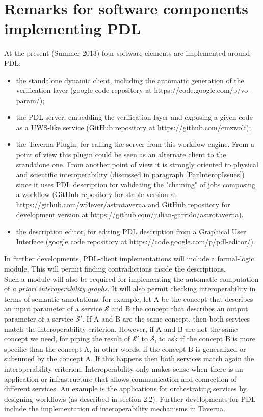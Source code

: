 \documentclass[a4paper,11pt] {ivoa}
\begin{document}
\section{Remarks for software components implementing PDL}
At the present (Summer 2013) four software elements are implemented around PDL:
\begin{itemize}
\item the standalone dynamic client, including the automatic generation of the verification layer (google code repository at https://code.google.com/p/vo-param/);
\item the PDL server, embedding the verification layer and exposing a given code as a UWS-like service (GitHub repository at https://github.com/cmzwolf);
\item the Taverna Plugin, for calling the server from this workflow engine. From a point of view this plugin could be seen as an alternate client to the standalone one. From another point of view it is strongly oriented to physical and scientific interoperability (discussed in paragraph \ref{ParInteropIssues}) since it uses PDL description for validating the "chaining" of jobs composing a workflow (GitHub repository for stable version at https://github.com/wf4ever/astrotaverna
 and GitHub repository for development version at https://github.com/julian-garrido/astrotaverna).
\item the description editor, for editing PDL description from a Graphical User Interface (google code repository at https://code.google.com/p/pdl-editor/).
\end{itemize}

In further developments, PDL-client implementations will include a formal-logic module. This will permit finding contradictions inside the descriptions.\\
Such a  module will also be required for implementing the automatic computation of {\it a priori interoperability graphs}. 
It will also permit checking interoperability in terms of semantic annotations: for example, let A be the concept that describes an input parameter of a service $\mathcal S$ and B the concept that describes an output parameter of a service $\mathcal S'$. If A and B are the same concept, then both services match the interoperability criterion. However, if A and B are not the same concept we need, for piping the result of  
$\mathcal S'$ to $\mathcal S$, to ask if the concept B is more specific than the concept A, in other words, if the concept B is generalized or subsumed by the concept A. If this happens then both services match again the interoperability criterion. 
Interoperability only makes sense when there is an application or infrastructure that allows communication and connection of different services. An example is the applications for orchestrating services by designing workflows (as described in section 2.2). Further developments for PDL include the implementation of interoperability mechanisms in Taverna.
\end{document}
